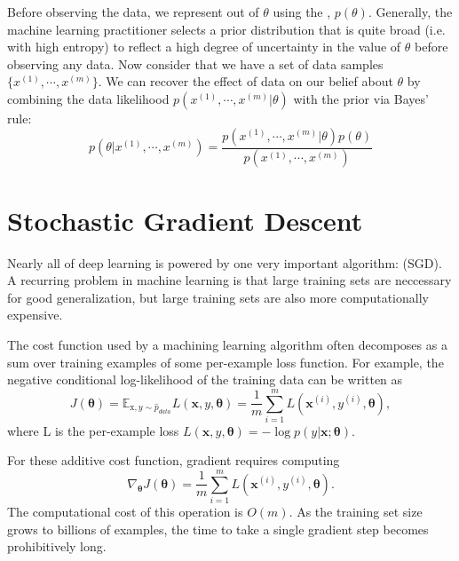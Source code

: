 Before observing the data, we represent out  of $\theta$ using the , $p(\theta)$.
Generally, the machine learning practitioner selects a prior distribution that is quite broad (i.e. with high entropy) to reflect a high degree of uncertainty in the value of $\theta$ before observing any data.
Now consider that we have a set of data samples $\{x^{(1)}, \cdots,x^{(m)}\}$.
We can recover the effect of data on our belief about $\theta$ by combining the data likelihood $p(x^{(1)},\cdots,x^{(m)}|\theta)$ with the prior via Bayes' rule:
\begin{equation}
  p(\theta|x^{(1)},\cdots,x^{(m)}) = \frac{p(x^{(1)},\cdots,x^{(m)}|\theta)p(\theta)}{p(x^{(1)},\cdots,x^{(m)})}
\end{equation}







\section{Stochastic Gradient Descent}

Nearly all of deep learning is powered by one very important algorithm:  (SGD).
A recurring problem in machine learning is that large training sets are neccessary for good generalization, but large training sets are also more computationally expensive.


The cost function used by a machining learning algorithm often decomposes as a sum over training examples of some per-example loss function.
For example, the negative conditional log-likelihood of the training data can be written as
\begin{equation}
  J(\bm{\theta}) = \mathbb{E}_{\mathrm{x},y \sim \hat{p}_{data}} L(\bm{x},y,\bm{\theta}) = \frac{1}{m}\sum_{i=1}^m L(\bm{x}^{(i)},y^{(i)},\bm{\theta}),
\end{equation}
where L is the per-example loss $L(\bm{x},y,\bm{\theta}) = -\log p(y|\bm{x};\bm{\theta})$.

For these additive cost function, gradient requires computing
\begin{equation}
  \nabla_{\bm{\theta}} J(\bm{\theta}) = \frac{1}{m}\sum_{i=1}^m L(\bm{x}^{(i)},y^{(i)},\bm{\theta}).
\end{equation}
The computational cost of this operation is $O(m)$.
As the training set size grows to billions of examples, the time to take a single gradient step becomes prohibitively long.

